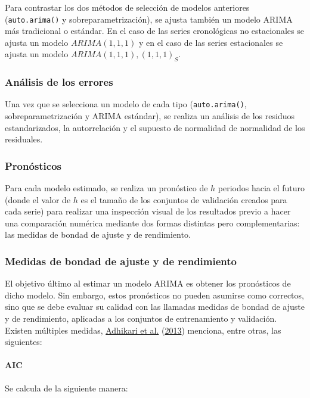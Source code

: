 \documentclass[
]{article}
\begin{document}
Para contrastar los dos métodos de selección de modelos anteriores
(\texttt{auto.arima()} y sobreparametrización), se ajusta también un
modelo ARIMA más tradicional o estándar. En el caso de las series
cronológicas no estacionales se ajusta un modelo \(ARIMA(1,1,1)\) y en
el caso de las series estacionales se ajusta un modelo
\(ARIMA(1,1,1),(1,1,1)_S\).

\subsubsection{Análisis de los errores}

Una vez que se selecciona un modelo de cada tipo (\texttt{auto.arima()},
sobreparametrización y ARIMA estándar), se realiza un análisis de los
residuos estandarizados, la autorrelación y el supuesto de normalidad de
normalidad de los residuales.

\subsubsection{Pronósticos}

Para cada modelo estimado, se realiza un pronóstico de \(h\) periodos
hacia el futuro (donde el valor de \(h\) es el tamaño de los conjuntos
de validación creados para cada serie) para realizar una inspección
visual de los resultados previo a hacer una comparación numérica
mediante dos formas distintas pero complementarias: las medidas de
bondad de ajuste y de rendimiento.

\subsubsection{Medidas de bondad de ajuste y de rendimiento}

El objetivo último al estimar un modelo ARIMA es obtener los pronósticos
de dicho modelo. Sin embargo, estos pronósticos no pueden asumirse como
correctos, sino que se debe evaluar su calidad con las llamadas medidas
de bondad de ajuste y de rendimiento, aplicadas a los conjuntos de
entrenamiento y validación. Existen múltiples medidas,
\protect\hyperlink{ref-medidas}{Adhikari et al.}
(\protect\hyperlink{ref-medidas}{2013}) menciona, entre otras, las
siguientes:

\paragraph{AIC}

Se calcula de la siguiente manera:
\end{document}

